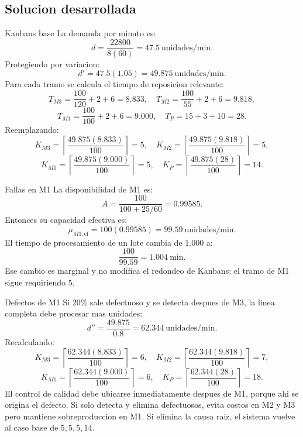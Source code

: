 \subsection{Solucion desarrollada}

\begin{respuesta}{Kanbans base}
La demanda por minuto es:
\[
d=\frac{22800}{8(60)}=47.5\ \text{unidades/min}.
\]
Protegiendo por variacion:
\[
d'=47.5(1.05)=49.875\ \text{unidades/min}.
\]
Para cada tramo se calcula el tiempo de reposicion relevante:
\[
T_{M3}=\frac{100}{120}+2+6=8.833,
\quad
T_{M2}=\frac{100}{55}+2+6=9.818,
\]
\[
T_{M1}=\frac{100}{100}+2+6=9.000,
\quad
T_P=15+3+10=28.
\]
Reemplazando:
\[
K_{M3}=\left\lceil\frac{49.875(8.833)}{100}\right\rceil=5,
\quad
K_{M2}=\left\lceil\frac{49.875(9.818)}{100}\right\rceil=5,
\]
\[
K_{M1}=\left\lceil\frac{49.875(9.000)}{100}\right\rceil=5,
\quad
K_P=\left\lceil\frac{49.875(28)}{100}\right\rceil=14.
\]
\end{respuesta}

\begin{respuesta}{Fallas en M1}
La disponibilidad de M1 es:
\[
A=\frac{100}{100+25/60}=0.99585.
\]
Entonces su capacidad efectiva es:
\[
\mu_{M1,\text{ef}}=100(0.99585)=99.59\ \text{unidades/min}.
\]
El tiempo de procesamiento de un lote cambia de \(1.000\) a:
\[
\frac{100}{99.59}=1.004\ \text{min}.
\]
Ese cambio es marginal y no modifica el redondeo de Kanbans: el tramo de M1 sigue requiriendo \(5\).
\end{respuesta}

\begin{respuesta}{Defectos de M1}
Si \(20\%\) sale defectuoso y se detecta despues de M3, la linea completa debe procesar mas unidades:
\[
d''=\frac{49.875}{0.8}=62.344\ \text{unidades/min}.
\]
Recalculando:
\[
K_{M3}=\left\lceil\frac{62.344(8.833)}{100}\right\rceil=6,
\quad
K_{M2}=\left\lceil\frac{62.344(9.818)}{100}\right\rceil=7,
\]
\[
K_{M1}=\left\lceil\frac{62.344(9.000)}{100}\right\rceil=6,
\quad
K_P=\left\lceil\frac{62.344(28)}{100}\right\rceil=18.
\]
El control de calidad debe ubicarse inmediatamente despues de M1, porque ahi se origina el defecto. Si solo detecta y elimina defectuosos, evita costos en M2 y M3 pero mantiene sobreproduccion en M1. Si elimina la causa raiz, el sistema vuelve al caso base de \(5,5,5,14\).
\end{respuesta}
